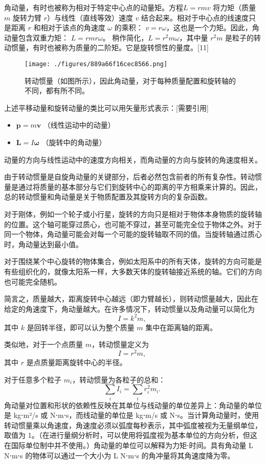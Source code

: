 角动量，有时也被称为相对于特定中心点的动量矩。方程\( L = rmv \) 将力矩（质量 \( m \) 旋转力臂 \( r \)）与线性（直线等效）速度 \( v \) 结合起来。相对于中心点的线速度只是距离 \( r \) 和相对于该点的角速度 \( \omega \) 的乘积：  \( v = r\omega \)，这也是一个力矩。因此，角动量包含双重力矩：  \( L = rmr\omega \)。  稍作简化，\( L = r^{2}m\omega \)，其中量 \( r^{2}m \) 是粒子的转动惯量，有时也被称为质量的二阶矩。它是旋转惯性的量度。[11]
\begin{figure}[ht]
\centering
\texttt{[image: ./figures/889a66f16cec8566.png]}
\caption{转动惯量（如图所示），因此角动量，对于每种质量配置和旋转轴的不同，都有所不同。} \label{fig_JDL_3}
\end{figure}
上述平移动量和旋转动量的类比可以用矢量形式表示：[需要引用]
\begin{itemize}
\item \(\mathbf{p} = m\mathbf{v} \) （线性运动中的动量）
\item \( \mathbf{L} = I{\boldsymbol{\omega}} \) （旋转中的角动量）
\end{itemize}

动量的方向与线性运动中的速度方向相关，而角动量的方向与旋转的角速度相关。

由于转动惯量是自旋角动量的关键部分，后者必然包含前者的所有复杂性。转动惯量是通过将质量的基本部分与它们到旋转中心的距离的平方相乘来计算的。因此，总的转动惯量和角动量是关于物质配置及其旋转方向的复杂函数。

对于刚体，例如一个轮子或小行星，旋转的方向只是相对于物体本身物质的旋转轴的位置。这个轴可能穿过质心，也可能不穿过，甚至可能完全位于物体之外。对于同一个物体，角动量可能会对每一个可能的旋转轴取不同的值。当旋转轴通过质心时，角动量达到最小值。

对于围绕某个中心旋转的物体集合，例如太阳系中的所有天体，旋转的方向可能是有些组织化的，就像太阳系一样，大多数天体的旋转轴接近系统的轴。它们的方向也可能完全随机。

简言之，质量越大，距离旋转中心越远（即力臂越长），则转动惯量越大，因此在给定的角速度下，角动量越大。在许多情况下，转动惯量以及角动量可以简化为
\[ I = k^2 m,~ \]
其中 \( k \) 是回转半径，即可以认为整个质量 \( m \) 集中在距离轴的距离。

类似地，对于一个点质量 \( m \)，转动惯量定义为
\[ I = r^2 m,~\]
其中 \( r \) 是点质量距离旋转中心的半径。

对于任意多个粒子 \( m_i \)，转动惯量为各粒子的总和：
\[ \sum_{i} I_i = \sum_{i} r_i^2 m_i. ~\]
角动量对位置和形状的依赖性反映在其单位与线动量的单位差异上：角动量的单位是 kg⋅m²/s 或 N⋅m⋅s，而线动量的单位是 kg⋅m/s 或 N⋅s。当计算角动量时，使用转动惯量乘以角速度，角速度必须以弧度每秒表示，其中弧度被视为无量纲单位，取值为 1。（在进行量纲分析时，可以使用将弧度视为基本单位的方向分析，但这在国际单位制中并不使用。）角动量的单位可以解释为力矩⋅时间。具有角动量 L N⋅m⋅s 的物体可以通过一个大小为 L N⋅m⋅s 的角冲量将其角速度降为零。

